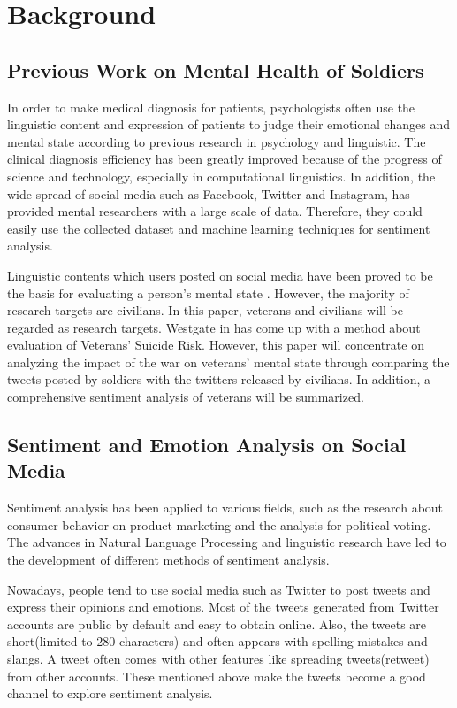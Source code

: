 \section{Background}

\subsection{Previous Work on Mental Health of Soldiers}

In order to make medical diagnosis for patients, psychologists often use the linguistic content and expression of patients to judge their emotional changes and mental state according to previous research in psychology and linguistic. The clinical diagnosis efficiency has been greatly improved because of the progress of science and technology, especially in computational linguistics. In addition, the wide spread of social media such as Facebook, Twitter and Instagram, has provided mental researchers with a large scale of data. Therefore, they could easily use the collected dataset and machine learning techniques for sentiment analysis.

Linguistic contents which users posted on social media have been proved to be the basis for evaluating a person's mental state \citep{becauseIwastoldsomuch} \citep{GUNTUKU201743}. However, the majority of research targets are civilians. In this paper, veterans and civilians will be regarded as research targets. Westgate in \citep{doi:10.1176/appi.ps.201400283} has come up with a method about evaluation of Veterans’ Suicide Risk. However, this paper will concentrate on analyzing the impact of the war on veterans' mental state through comparing the tweets posted by soldiers with the twitters released by civilians. In addition, a comprehensive sentiment analysis of veterans will be summarized.

\subsection{Sentiment and Emotion Analysis on Social Media}

Sentiment analysis has been applied to various fields, such as the research about consumer behavior on product marketing and the analysis for political voting. The advances in Natural Language Processing and linguistic research have led to the development of different methods of sentiment analysis.

Nowadays, people tend to use social media such as Twitter to post tweets and express their opinions and emotions. Most of the tweets generated from Twitter accounts are public by default and easy to obtain online. Also, the tweets are short(limited to 280 characters) and often appears with spelling mistakes and slangs. A tweet often comes with other features like spreading tweets(retweet) from other accounts. These mentioned above make the tweets become a good channel to explore sentiment analysis.

